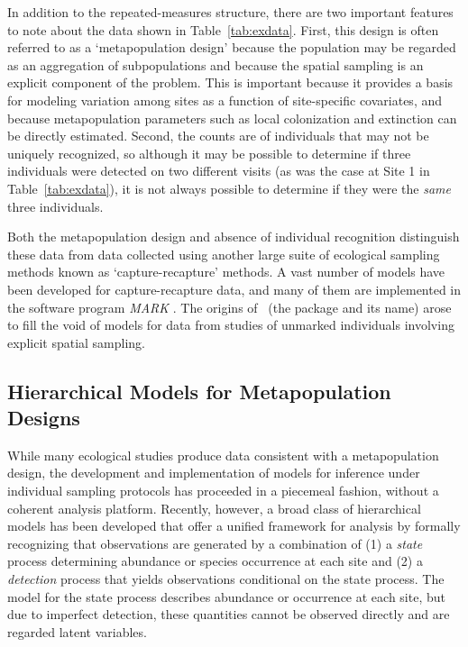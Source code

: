 \documentclass[article,shortnames]{jss}
\newcommand{\um}{\pkg{unmarked}}
\begin{document}
In addition to the repeated-measures structure, there are two important 
features to note about the data shown in Table~\ref{tab:exdata}.  First, 
this design is often referred to as a `metapopulation design' because 
the population may be regarded as an aggregation of subpopulations and 
because the spatial sampling is an explicit component of the problem. 
This is important because it provides a basis for modeling variation 
among sites as a function of site-specific covariates, and because 
metapopulation parameters such as local colonization and extinction 
can be directly estimated. Second, the counts are of individuals that 
may not be uniquely recognized, so although it may be possible to 
determine if three individuals were detected on two different visits 
(as was the case at Site 1 in Table~\ref{tab:exdata}), it is not always 
possible to determine if they were the {\it same} three individuals.  

Both the metapopulation design and absence of individual recognition 
distinguish these data from data collected using another large suite of 
ecological sampling methods known as `capture-recapture' methods. A vast number 
of models have been developed for capture-recapture data, and many of them 
are implemented in the software program \emph{MARK} 
\citep{whiteBurnham99_MARK}. The origins of \um\ (the package and its name) 
arose to fill the void of models for data from studies of unmarked 
individuals involving explicit spatial sampling. 

\subsection{Hierarchical Models for Metapopulation Designs}

While many ecological studies produce data consistent with a 
metapopulation design, the development and implementation of 
models for inference under individual sampling protocols has 
proceeded in a piecemeal fashion, without a coherent analysis 
platform. Recently, however, a broad 
class of hierarchical models \citetext{see \citet{royleDorazio08} for a 
general treatment} has been developed that offer a unified 
framework for analysis by formally recognizing that observations are 
generated by a combination of (1) a \emph{state} process 
determining abundance or species occurrence at each site and (2) a 
\emph{detection} process that yields observations conditional on the 
state process. The model for the state process describes abundance or 
occurrence at each site, but due to imperfect detection, these quantities 
cannot be observed directly and are regarded latent variables. 
\end{document}
